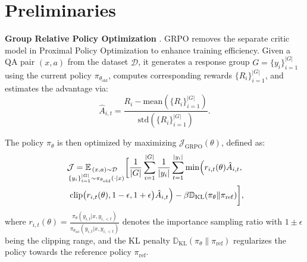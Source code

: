 \section{Preliminaries}

\textbf{Group Relative Policy Optimization} \citep[\textbf{GRPO},][]{GRPO}.
GRPO removes the separate critic model in Proximal Policy Optimization \citep[PPO,][]{PPO} to enhance training efficiency.
Given a QA pair $(x,a)$ from the dataset $\mathcal D$, it generates a response group $G=\{y_i\}_{i=1}^{|G|}$ using the current policy $\pi_{\theta_\text{old}}$, computes corresponding rewards $\{R_i\}_{i=1}^{|G|}$, and estimates the advantage via:
\begin{equation}\label{eqn:advantage}
    \hat A_{i,t} = \frac{R_i - \mathrm{mean}(\{R_i\}_{i=1}^{|G|})}{\mathrm{std}(\{R_i\}_{i=1}^{|G|})}.
\end{equation}

The policy $\pi_\theta$ is then optimized by maximizing $\mathcal J_\text{GRPO}(\theta)$, defined as:
\begin{gather*}%
   \mathcal J =\mathbb E_{
    \mathmakebox[4em][r]{
        \substack{ 
        \hspace{2em}(x,a)\sim\mathcal{D}\\
        \{y_i\}_{i=1}^{|G|} \sim\pi_{\theta_{\text{old}}}(\cdot|x)
        }
    }}\bigg[
     \frac{1}{|G|}\sum_{i=1}^{|G|}\frac{1}{|y_i|}\sum_{t=1}^{|y_i|}\min \Bigl( r_{i,t}(\theta)\hat{A}_{i,t}, \notag \\
    \;\;  \text{clip}\bigl(r_{i,t}(\theta), 1-\epsilon, 1+\epsilon\bigr)\hat{A}_{i,t} \Bigr) - \beta\mathbb D_\mathrm{KL}(\pi_\theta\|\pi_\mathrm{ref}) \bigg],
\end{gather*}
where $r_{i,t}(\theta) = \frac{\pi_{\theta}(y_{i,t}|x, y_{i,<t})}{\pi_{\theta_{\text{old}}}(y_{i,t}|x, y_{i,<t})}$ denotes the importance sampling ratio with $1\pm\epsilon$ being the clipping range, and the KL penalty  $\mathbb D_\mathrm{KL}(\pi_\theta\|\pi_\mathrm{ref})$ regularizes the policy towards the reference policy $\pi_\mathrm{ref}$.

